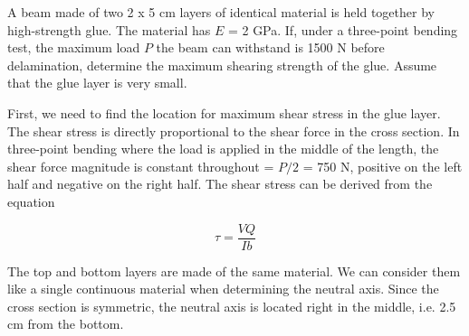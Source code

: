 \documentclass[
fontsize=10pt,
a4paper,
twosides=false,
open=any,
svgnames,
]{kaobook} %
\begin{document}
\begin{example}
  A beam made of two 2 x 5 cm layers of identical material is held together by high-strength glue. The material has $E$ = 2 GPa. If, under a three-point bending test, the maximum load $P$ the beam can withstand is 1500 N before delamination, determine the maximum shearing strength of the glue. Assume that the glue layer is very small.

  \begin{figure}[H]
    \centering
  \end{figure}
  
  First, we need to find the location for maximum shear stress in the glue layer. The shear stress is directly proportional to the shear force in the cross section. In three-point bending where the load is applied in the middle of the length, the shear force magnitude is constant throughout = $P/2$ = 750 N, positive on the left half and negative on the right half. The shear stress can be derived from the equation

  \begin{equation*}
    \tau  = \frac{VQ}{Ib}
  \end{equation*}

  The top and bottom layers are made of the same material. We can consider them like a single continuous material when determining the neutral axis. Since the cross section is symmetric, the neutral axis is located right in the middle, i.e. 2.5 cm from the bottom.


\end{example}
\end{document}
